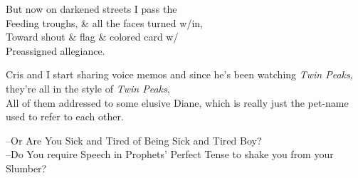 \secdiv



\secdiv


 
\secdiv



\secdiv



\secdiv



\newpage

\secdiv



\secdiv

But now on darkened streets I pass the \\ 
Feeding troughs, \& all the faces turned w/in, \\
Toward shout \& flag \& colored card w/ \\
Preassigned allegiance.

\secdiv



\secdiv



\secdiv



\secdiv

Cris and I start sharing voice memos and since he's been watching \textit{Twin Peaks}, they're all in the style of \textit{Twin Peaks}, \\
All of them addressed to some elusive Diane, which is really just the pet-name used to refer to each other.



\secdiv



\secdiv

--Or Are You Sick and Tired of Being Sick and Tired Boy? \\
--Do You require Speech in Prophets' Perfect Tense to shake you from your Slumber?

\secdiv



